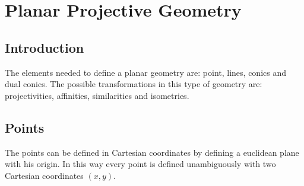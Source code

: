 \documentclass[12pt, a4paper]{report}
\begin{document}
\newpage

\chapter{Planar Projective Geometry}
    \section{Introduction}
    The elements needed to define a planar geometry are: point, lines, conics and dual conics. The possible transformations in this type of geometry are: projectivities, 
    affinities, similarities and isometries. 

    \section{Points}
    The points can be defined in Cartesian coordinates by defining a euclidean plane with his origin. In this way every point is defined unambiguously with two Cartesian 
    coordinates $(x,y)$. 
\end{document}
